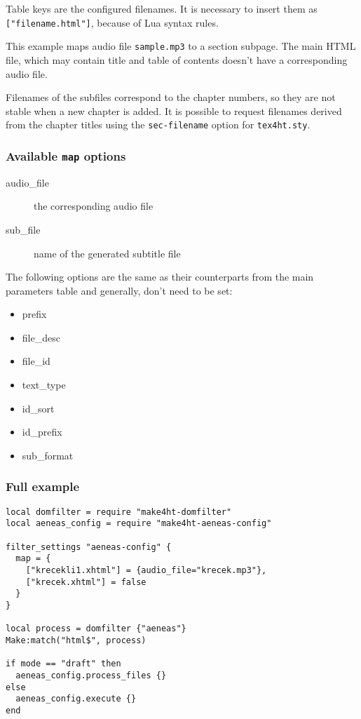Table keys are the configured filenames. It is necessary to insert them
as \texttt{{[}"filename.html"{]}}, because of Lua syntax rules.

This example maps audio file \texttt{sample.mp3} to a section subpage.
The main HTML file, which may contain title and table of contents
doesn't have a corresponding audio file.

Filenames of the subfiles correspond to the chapter numbers, so they are
not stable when a new chapter is added. It is possible to request
filenames derived from the chapter titles using the
\texttt{sec-filename} option for \texttt{tex4ht.sty}.

\hypertarget{available-map-options}{%
\subsubsection{\texorpdfstring{Available \texttt{map}
options}{Available map options}}\label{available-map-options}}

\begin{description}
\item[audio\_file]
the corresponding audio file
\item[sub\_file]
name of the generated subtitle file
\end{description}

The following options are the same as their counterparts from the main
parameters table and generally, don't need to be set:

\begin{itemize}
\tightlist
\item
  prefix
\item
  file\_desc
\item
  file\_id
\item
  text\_type
\item
  id\_sort
\item
  id\_prefix
\item
  sub\_format
\end{itemize}

\hypertarget{full-example}{%
\subsubsection{Full example}\label{full-example}}

\begin{verbatim}
local domfilter = require "make4ht-domfilter"
local aeneas_config = require "make4ht-aeneas-config"

filter_settings "aeneas-config" {
  map = {
    ["krecekli1.xhtml"] = {audio_file="krecek.mp3"}, 
    ["krecek.xhtml"] = false
  }
}

local process = domfilter {"aeneas"}
Make:match("html$", process)

if mode == "draft" then
  aeneas_config.process_files {}
else
  aeneas_config.execute {}
end
\end{verbatim}

